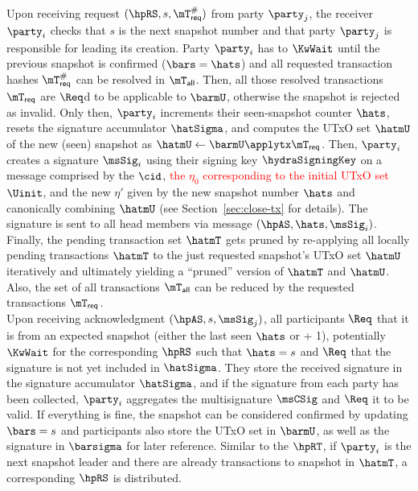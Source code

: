 \quad Upon receiving request
$(\hpRS,s,\mT_{\mathsf{req}}^{\#})$ from party $\party_j$, the receiver
$\party_i$ checks that $s$ is the next snapshot number and that party $\party_j$
is responsible for leading its creation. Party $\party_i$
has to $\KwWait$ until the previous snapshot is confirmed ($\bars = \hats$) and
all requested transaction hashes $\mT_{\mathsf{req}}^{\#}$ can be resolved in
$\mT_{\mathsf{all}}$. Then, all those resolved transactions $\mT_{\mathsf{req}}$
are $\Req$d to be applicable to $\barmU$, otherwise the snapshot is rejected
as invalid. Only then, $\party_i$ increments their seen-snapshot counter
$\hats$, resets the signature accumulator $\hatSigma$, and computes the UTxO set
$\hatmU$ of the new (seen) snapshot as
$\hatmU \gets \barmU \applytx \mT_{\mathsf{req}}$. Then, $\party_i$ creates a
signature $\msSig_i$ using their signing key $\hydraSigningKey$ on a message
comprised by the $\cid$, \textcolor{red}{the $\eta_{0}$ corresponding to the
	initial UTxO set $\Uinit$}, and the new $\eta'$ given by the new snapshot number
$\hats$ and canonically combining $\hatmU$ (see Section~\ref{sec:close-tx} for
details). The signature is sent to all head members via message
$(\hpAS,\hats,\msSig_i)$. Finally, the pending transaction set $\hatmT$ gets
pruned by re-applying all locally pending transactions $\hatmT$ to the just
requested snapshot's UTxO set $\hatmU$ iteratively and ultimately yielding a
``pruned'' version of $\hatmT$ and $\hatmU$. Also, the set of all transactions
$\mT_{\mathsf{all}}$ can be reduced by the requested
transactions $\mT_{\mathsf{req}}$.\\

\quad Upon receiving acknowledgment $(\hpAS,s,\msSig_j)$, all
participants $\Req$ that it is from an expected snapshot (either the last seen
$\hats$ or + 1), potentially $\KwWait$ for the corresponding $\hpRS$ such that
$\hats = s$ and $\Req$ that the signature is not yet included in $\hatSigma$.
They store the received signature in the signature accumulator $\hatSigma$, and
if the signature from each party has been collected, $\party_i$ aggregates the
multisignature $\msCSig$ and $\Req$ it to be valid. If everything is fine, the
snapshot can be considered confirmed by updating $\bars=s$ and participants also
store the UTxO set in $\barmU$, as well as the signature in $\barsigma$ for
later reference. Similar to the $\hpRT$, if $\party_i$ is the next snapshot
leader and there are already transactions to snapshot in $\hatmT$, a
corresponding $\hpRS$ is distributed.

